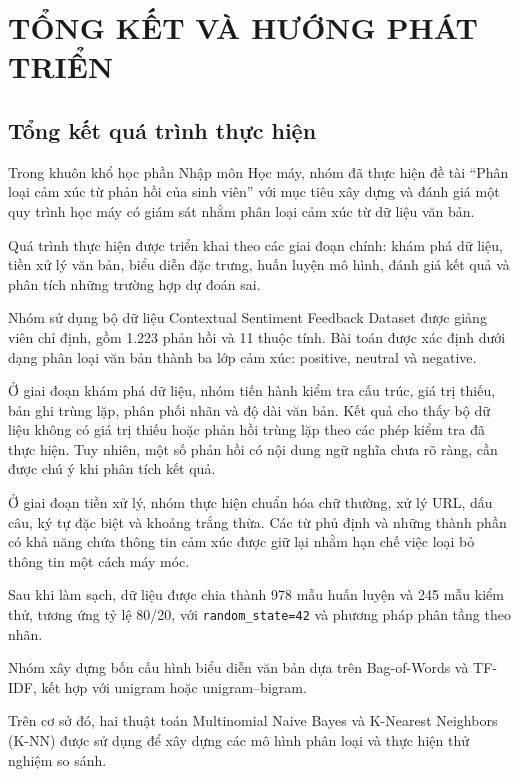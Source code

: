 
\chapter{TỔNG KẾT VÀ HƯỚNG PHÁT TRIỂN}


\section{Tổng kết quá trình thực hiện}

Trong khuôn khổ học phần Nhập môn Học máy, nhóm đã
thực hiện đề tài ``Phân loại cảm xúc từ phản hồi của
sinh viên'' với mục tiêu xây dựng và đánh giá một
quy trình học máy có giám sát nhằm phân loại
cảm xúc từ dữ liệu văn bản.

Quá trình thực hiện được triển khai theo các giai
đoạn chính: khám phá dữ liệu, tiền xử lý văn bản,
biểu diễn đặc trưng, huấn luyện mô hình, đánh giá
kết quả và phân tích những trường hợp dự đoán sai.

Nhóm sử dụng bộ dữ liệu Contextual Sentiment
Feedback Dataset được giảng viên chỉ định,
gồm 1.223 phản hồi và 11 thuộc tính. Bài toán
được xác định dưới dạng phân loại văn bản
thành ba lớp cảm xúc: positive, neutral
và negative.

Ở giai đoạn khám phá dữ liệu, nhóm tiến hành
kiểm tra cấu trúc, giá trị thiếu, bản ghi
trùng lặp, phân phối nhãn và độ dài văn bản.
Kết quả cho thấy bộ dữ liệu không có giá trị
thiếu hoặc phản hồi trùng lặp theo các phép
kiểm tra đã thực hiện. Tuy nhiên, một số
phản hồi có nội dung ngữ nghĩa chưa rõ ràng,
cần được chú ý khi phân tích kết quả.

Ở giai đoạn tiền xử lý, nhóm thực hiện chuẩn hóa
chữ thường, xử lý URL, dấu câu, ký tự đặc biệt
và khoảng trắng thừa. Các từ phủ định và những
thành phần có khả năng chứa thông tin cảm xúc
được giữ lại nhằm hạn chế việc loại bỏ thông
tin một cách máy móc.

Sau khi làm sạch, dữ liệu được chia thành
978 mẫu huấn luyện và 245 mẫu kiểm thử,
tương ứng tỷ lệ 80/20, với
\texttt{random\_state=42} và phương pháp
phân tầng theo nhãn.

Nhóm xây dựng bốn cấu hình biểu diễn văn bản
dựa trên Bag-of-Words và TF-IDF, kết hợp với
unigram hoặc unigram--bigram.

Trên cơ sở đó, hai thuật toán Multinomial
Naive Bayes và K-Nearest Neighbors (K-NN)
được sử dụng để xây dựng các mô hình phân
loại và thực hiện thử nghiệm so sánh.

